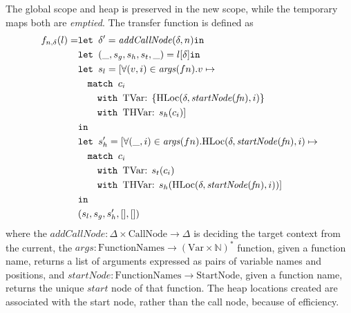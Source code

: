 The global scope and heap is preserved in the new scope, while the temporary maps both are \emph{emptied}. The transfer function is defined as
\begin{align}
      f_{n,\delta}(l) =     &\texttt{let } \delta' = \mathit{addCallNode}(\delta, n) \texttt{in }\notag\\
                            &\texttt{let } (\_, s_g, s_h,s_t, \_) = l[\delta] \texttt{in }\notag\\
                            &\texttt{let } s_l = [\forall (v, i) \in \mathit{args}(fn). v \mapsto \notag\\
                            &\quad\texttt{match }c_i\notag\\
                            &\quad\quad\texttt{with }\text{TVar}\text{: } \{\text{HLoc}(\delta, \mathit{startNode}(\mathit{fn}), i)\}\notag\\
                            &\quad\quad\texttt{with }\text{THVar}\text{: } s_h(c_i)]\notag\\
                            & \texttt{in }\notag\\
                            &\texttt{let } s_h' = [\forall (\_, i) \in \mathit{args}(fn). \text{HLoc}(\delta, \mathit{startNode}(\mathit{fn}), i) \mapsto \notag\\
                            &\quad\texttt{match }c_i\notag\\
                            &\quad\quad\texttt{with }\text{TVar}\text{: } s_t(c_i)\notag\\
                            &\quad\quad\texttt{with }\text{THVar}\text{: } s_h(\text{HLoc}(\delta, \mathit{startNode}(\mathit{fn}), i))]\notag\\
                            & \texttt{in }\notag\\
                            &(s_l, s_g, s_h',[], [])
\end{align}
where the $\mathit{addCallNode} : \Delta \times \text{CallNode} \rightarrow \Delta$ is deciding the target context from the current, the $\mathit{args} : \text{FunctionNames} \rightarrow (\text{Var} \times \mathbb{N})^*$ function, given a function name, returns a list of arguments expressed as pairs of variable names and positions, and $\mathit{startNode} : \text{FunctionNames} \rightarrow \text{StartNode}$, given a function name, returns the unique $\mathit{start}$ node of that function. The heap locations created are associated with the start node, rather than the call node, because of efficiency. 

